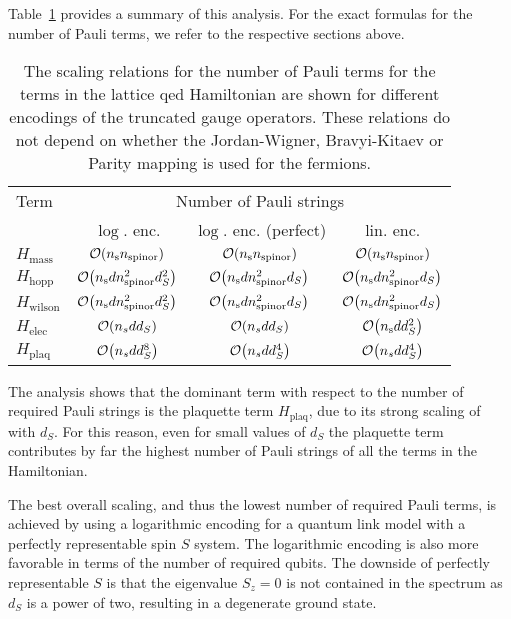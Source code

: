 Table~\ref{4:tbl:hamiltonian_scaling} provides a summary
of this analysis. For the exact formulas for the number of Pauli terms, we refer to the respective sections above. 

\begin{table}[htb]
\centering
\begin{tabular}{@{}lccc@{}}\toprule
Term & \multicolumn{3}{c}{Number of Pauli strings} \\ 
\cmidrule{2-4} 
& $\log$. enc. & $\log$. enc. (perfect) & lin. enc. \\
\midrule

$H_\text{mass}$ & 
$\order{n_\text{s} n_\text{spinor}}$ & 
$\order{n_\text{s} n_\text{spinor}}$ & 
$\order{n_\text{s} n_\text{spinor}}$
\\

$H_\text{hopp}$ & 
$\order{n_\text{s} d n_\text{spinor}^2 d_S^2}$ &
$\order{n_\text{s} d n_\text{spinor}^2 d_S}$ &
$\order{n_\text{s} d n_\text{spinor}^2 d_S}$\\

$H_\text{wilson}$  & 
$\order{n_\text{s} d n_\text{spinor}^2 d_S^2}$ &
$\order{n_\text{s} d n_\text{spinor}^2 d_S}$ &
$\order{n_\text{s} d n_\text{spinor}^2 d_S}$
\\

$H_\text{elec}$ & 
$\order{n_s d d_S} $ &
$\order{n_s d d_S} $ &
$\order{n_\text{s} d d_S^2}$
\\

$H_\text{plaq}$ 
& $\order{n_s d d_S^8}$ &  $\order{n_s d d_S^4}$
& $\order{n_s d d_S^4}$
\\

\bottomrule
\end{tabular}
\centering
\label{4:tbl:hamiltonian_scaling}
\caption{The scaling relations for the number of Pauli terms for the terms in the lattice \gls{qed} Hamiltonian are shown for different encodings of the truncated gauge operators. These relations do not depend on whether the Jordan-Wigner, Bravyi-Kitaev or Parity mapping is used for the fermions.}
\end{table}

The analysis shows that the dominant term with respect to the number
of required Pauli strings is the plaquette term $H_\text{plaq}$, due to its strong scaling of with $d_S$. For this reason, even for small values of $d_S$ the plaquette term contributes by far the highest number of Pauli strings of all the terms in the Hamiltonian. 

The best overall scaling, and thus the lowest number of required Pauli terms, is achieved by using a logarithmic encoding for a quantum link model with a perfectly representable spin $S$ system. The logarithmic encoding is also more favorable in terms of the number of required qubits. The downside of perfectly representable $S$ is that the eigenvalue $S_z = 0$ is not contained in the spectrum as $d_S$ is a power of two, resulting in a degenerate ground state.

